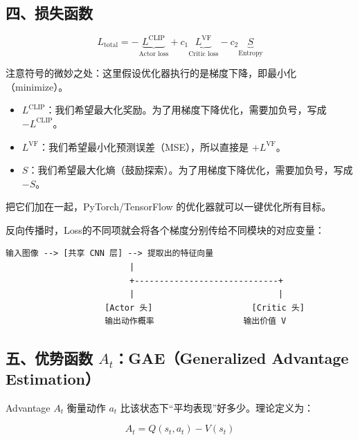 \hypertarget{ux56dbux635fux5931ux51fdux6570-1}{%
\subsection{四、损失函数}\label{ux56dbux635fux5931ux51fdux6570-1}}

\[
L_{\mathrm{total}}=-\underbrace{L^{\mathrm{CLIP}}}_{\text{Actor loss}}+c_1\underbrace{L^{\mathrm{VF}}}_{\text{Critic loss}}-c_2\underbrace{S}_{\text{Entropy}}
\]

注意符号的微妙之处：这里假设优化器执行的是梯度下降，即最小化（minimize）。

\begin{itemize}
\tightlist
\item
  \(L^{\mathrm{CLIP}}\)：我们希望最大化奖励。为了用梯度下降优化，需要加负号，写成 \(-L^{\mathrm{CLIP}}\)。
\item
  \(L^{\mathrm{VF}}\)：我们希望最小化预测误差（MSE），所以直接是 \(+L^{\mathrm{VF}}\)。
\item
  \(S\)：我们希望最大化熵（鼓励探索）。为了用梯度下降优化，需要加负号，写成 \(-S\)。
\end{itemize}

把它们加在一起，PyTorch/TensorFlow 的优化器就可以一键优化所有目标。

反向传播时，Loss的不同项就会将各个梯度分别传给不同模块的对应变量：

\begin{verbatim}
输入图像 --> [共享 CNN 层] --> 提取出的特征向量
                         |
                         +-----------------------------+
                         |                             |
                    [Actor 头]                    [Critic 头]
                    输出动作概率                  输出价值 V
\end{verbatim}

\hypertarget{ux4e94ux4f18ux52bfux51fdux6570-a_tgaegeneralized-advantage-estimation}{%
\subsection{\texorpdfstring{五、优势函数 \(A_t\)：GAE（Generalized Advantage Estimation）}{五、优势函数 A\_t：GAE（Generalized Advantage Estimation）}}\label{ux4e94ux4f18ux52bfux51fdux6570-a_tgaegeneralized-advantage-estimation}}

Advantage \(A_t\) 衡量动作 \(a_t\) 比该状态下``平均表现''好多少。理论定义为：

\[
A_t=Q(s_t,a_t)-V(s_t)
\]

